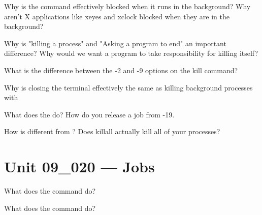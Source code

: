 \documentclass[letterpaper,12pt]{exam}
\newcommand{\unit}{Unit 09}
\begin{document}
\begin {questions}
\begin{samepage}
\question Why is the  command effectively blocked when it runs in the background?   Why aren't X applications like xeyes and xclock blocked when they are in the background?
\vspace{5mm}
\end{samepage}

\begin{samepage}
\question Why is "killing a process" and "Asking a program to end" an important difference?  Why would we want a program to take responsibility for killing itself? 
\vspace{5mm}
\end{samepage}

\begin{samepage}
\question What is the difference between the -2 and -9 options on the kill command? 
\vspace{5mm}
\end{samepage}

\begin{samepage}
\question Why is closing the terminal effectively the same as killing background processes with  
\vspace{5mm}
\end{samepage}

\begin{samepage}
\question What does the  do?  How do you release a job from -19. 
\vspace{5mm}
\end{samepage}

\begin{samepage}
\question How is  different from ?  Does killall actually kill all of your processes? 
\vspace{5mm}
\end{samepage}

\section*{\unit\_020 --- Jobs}

\begin{samepage}
\question What does the  command do? 
\vspace{5mm}
\end{samepage}

\begin{samepage}
\question What does the  command do? 
\vspace{5mm}
\end{samepage}


\end{questions}
\end{document}
